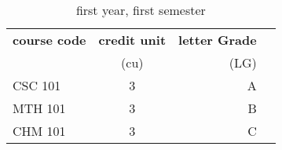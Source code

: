 \documentclass{article}
\begin{document}
	\begin{table}[h!]
		\begin{center}
			\caption{first year, first semester}
			\label{tab:table1}
			\begin{tabular}{l|c|r|c}
				\textbf{course code} & \textbf{credit unit} & \textbf{letter Grade}\\ 
				&(cu) & (LG)\\
				\hline
CSC 101 & 3 & A\\
MTH 101 & 3 & B\\
CHM 101 & 3 & C\\
			\end{tabular}
		\end{center}
	\end{table}
\end{document}
